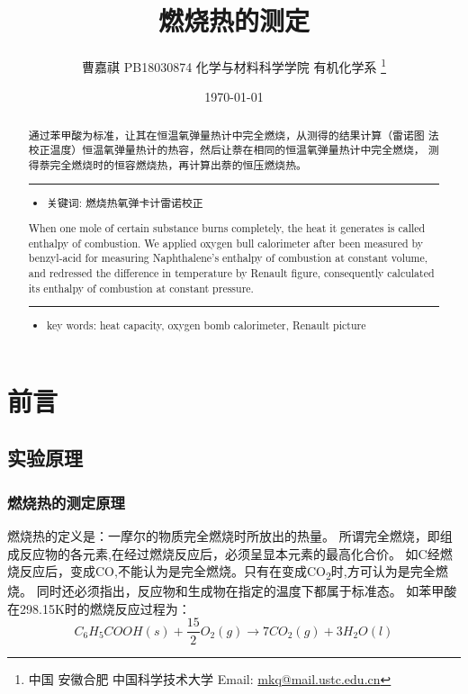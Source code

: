 \documentclass[11pt]{report}
\author{曹嘉祺 PB18030874 化学与材料科学学院 有机化学系 \thanks{中国 安徽合肥 中国科学技术大学 Email: \href{mailto:mkq@mail.ustc.edu.cn}{mkq@mail.ustc.edu.cn}}}
\date{\today}
\title{燃烧热的测定}
\begin{document}
\maketitle
\tableofcontents

\begin{abstract}
通过苯甲酸为标准，让其在恒温氧弹量热计中完全燃烧，从测得的结果计算（雷诺图
法校正温度）恒温氧弹量热计的热容，然后让萘在相同的恒温氧弹量热计中完全燃烧，
测得萘完全燃烧时的恒容燃烧热，再计算出萘的恒压燃烧热。


\noindent\rule{\textwidth}{0.5pt}
\begin{itemize}
\item 关键词: 燃烧热\quad 氧弹卡计\quad 雷诺校正
\end{itemize}
\end{abstract}
\begin{abstract}
When one mole of certain substance burns completely, the heat it generates
is called enthalpy of combustion. We applied oxygen bull calorimeter after been
measured by benzyl‐acid for measuring Naphthalene’s enthalpy of combustion at
constant volume, and redressed the difference in temperature by Renault figure,
consequently calculated its enthalpy of combustion at constant pressure.

\noindent\rule{\textwidth}{0.5pt}

\begin{itemize}
\item key words:  heat capacity, oxygen bomb calorimeter, Renault picture
\end{itemize}
\end{abstract}
\part{前言}
\label{sec:org1c433be}
\chapter{实验原理}
\label{sec:org72bebbf}
\section{燃烧热的测定原理}
\label{sec:org8f459db}
燃烧热的定义是：一摩尔的物质完全燃烧时所放出的热量。
所谓完全燃烧，即组成反应物的各元素,在经过燃烧反应后，必须呈显本元素的最高化合价。
如C经燃烧反应后，变成CO,不能认为是完全燃烧。只有在变成CO\textsubscript{2}时,方可认为是完全燃烧。
同时还必须指出，反应物和生成物在指定的温度下都属于标准态。
如苯甲酸在298.15K时的燃烧反应过程为：
\[
    C_{6}H_{5}COOH(s)+\frac{15}{2}O_{2}(g)\longrightarrow 7CO_{2}(g)+3H_{2}O(l)
    \]
\end{document}
